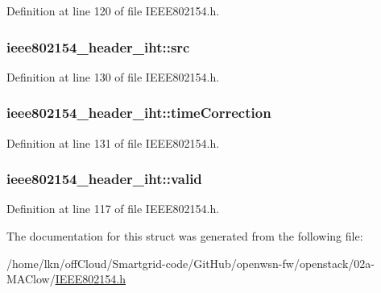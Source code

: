 Definition at line 120 of file I\+E\+E\+E802154.\+h.

\subsubsection[{\texorpdfstring{src}{src}}]{ ieee802154\+\_\+header\+\_\+iht\+::src}\hypertarget{structieee802154__header__iht_affec5666573dedd35d1adb7514d32cb3}{}\label{structieee802154__header__iht_affec5666573dedd35d1adb7514d32cb3}


Definition at line 130 of file I\+E\+E\+E802154.\+h.

\subsubsection[{\texorpdfstring{time\+Correction}{timeCorrection}}]{ ieee802154\+\_\+header\+\_\+iht\+::time\+Correction}\hypertarget{structieee802154__header__iht_abf74490f5f386e98f7a7e82930aee6e1}{}\label{structieee802154__header__iht_abf74490f5f386e98f7a7e82930aee6e1}


Definition at line 131 of file I\+E\+E\+E802154.\+h.

\subsubsection[{\texorpdfstring{valid}{valid}}]{ ieee802154\+\_\+header\+\_\+iht\+::valid}\hypertarget{structieee802154__header__iht_a679da8ba1fee3c03adde36208ef84070}{}\label{structieee802154__header__iht_a679da8ba1fee3c03adde36208ef84070}


Definition at line 117 of file I\+E\+E\+E802154.\+h.



The documentation for this struct was generated from the following file\+:\begin{DoxyCompactItemize}
\item 
/home/lkn/off\+Cloud/\+Smartgrid-\/code/\+Git\+Hub/openwsn-\/fw/openstack/02a-\/\+M\+A\+Clow/\hyperlink{_i_e_e_e802154_8h}{I\+E\+E\+E802154.\+h}\end{DoxyCompactItemize}
